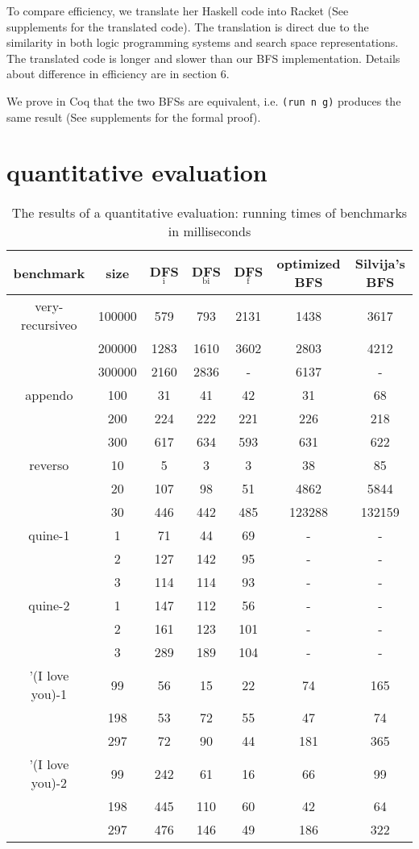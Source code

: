 \documentclass[format=acmlarge, review=true, authordraft=true]{acmart}
\begin{document}
To compare efficiency, we translate her Haskell code into Racket (See 
supplements for the translated code). The translation is direct 
due to the similarity in both logic programming systems and search space 
representations. The translated code is longer and slower than our BFS 
implementation. Details about 
difference in efficiency are in section 6.

We prove in Coq that the two BFSs are equivalent, i.e. \texttt{(run n g)} 
produces the same result (See supplements for the formal proof).

\section{quantitative evaluation}

\begin{table}
	\begin{tabular}{|c|c|c|c|c|c|c|}
		\hline 
		benchmark & size & DFS$_\textrm{i}$ & DFS$_\textrm{bi}$ & DFS$_\textrm{f}$ & optimized BFS & Silvija's BFS  
		\\
		\hline
		very-recursiveo & 100000 &  579 &  793 & 2131 & 1438 & 3617 \\
		& 200000 & 1283 & 1610 & 3602 & 2803 & 4212 \\
		& 300000 & 2160 & 2836 &    - & 6137 &    - \\
		\hline 
		appendo  & 100 &  31 &  41 &  42 &  31 &  68 \\ 
		& 200 & 224 & 222 & 221 & 226 & 218 \\ 
		& 300 & 617 & 634 & 593 & 631 & 622 \\ 
		\hline 
		reverso & 10 &   5 &   3 &   3 &     38 &     85 \\ 
		& 20 & 107 &  98 &  51 &   4862 &   5844 \\
		& 30 & 446 & 442 & 485 & 123288 & 132159 \\ 
		\hline
		quine-1 & 1 &  71 &  44 & 69 & - & - \\ 
		& 2 & 127 & 142 & 95 & - & - \\ 
		& 3 & 114 & 114 & 93 & - & - \\ 
		\hline
		quine-2 & 1 & 147 & 112 &  56 & - & - \\ 
		& 2 & 161 & 123 & 101 & - & - \\ 
		& 3 & 289 & 189 & 104 & - & - \\ 
		\hline 
		'(I love you)-1 &  99 & 56 & 15 & 22 &  74 & 165 \\ 
		& 198 & 53 & 72 & 55 &  47 &  74 \\
		& 297 & 72 & 90 & 44 & 181 & 365 \\ 
		\hline
		'(I love you)-2 &  99 & 242 &  61 & 16 &  66 &  99 \\ 
		& 198 & 445 & 110 & 60 &  42 &  64 \\
		& 297 & 476 & 146 & 49 & 186 & 322 \\ 
		\hline 
	\end{tabular}
	\caption{The results of a quantitative evaluation: running times of 
	benchmarks 
		in milliseconds}
	\label{compare-efficiency}
\end{table}
\end{document}
